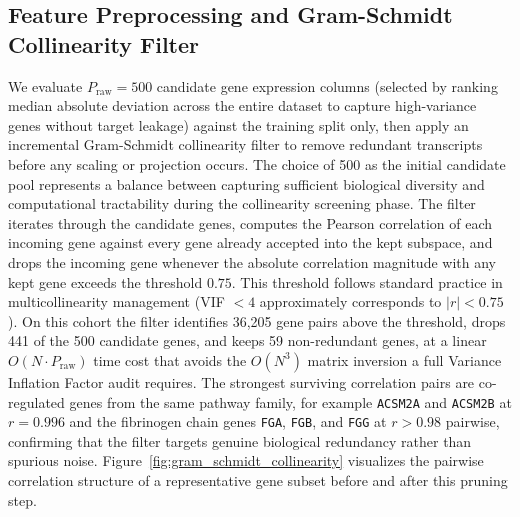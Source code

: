 \documentclass[sigconf, review=true]{acmart}
\begin{document}
\subsection{Feature Preprocessing and Gram-Schmidt Collinearity Filter}
We evaluate $P_{\text{raw}} = 500$ candidate gene expression columns (selected by ranking median absolute deviation across the entire dataset to capture high-variance genes without target leakage) against the training split only, then apply an incremental Gram-Schmidt collinearity filter to remove redundant transcripts before any scaling or projection occurs. The choice of 500 as the initial candidate pool represents a balance between capturing sufficient biological diversity and computational tractability during the collinearity screening phase. The filter iterates through the candidate genes, computes the Pearson correlation of each incoming gene against every gene already accepted into the kept subspace, and drops the incoming gene whenever the absolute correlation magnitude with any kept gene exceeds the threshold $0.75$. This threshold follows standard practice in multicollinearity management (VIF $< 4$ approximately corresponds to $|r| < 0.75$). On this cohort the filter identifies 36,205 gene pairs above the threshold, drops 441 of the 500 candidate genes, and keeps 59 non-redundant genes, at a linear $O(N \cdot P_{\text{raw}})$ time cost that avoids the $O(N^3)$ matrix inversion a full Variance Inflation Factor audit requires. The strongest surviving correlation pairs are co-regulated genes from the same pathway family, for example \texttt{ACSM2A} and \texttt{ACSM2B} at $r = 0.996$ and the fibrinogen chain genes \texttt{FGA}, \texttt{FGB}, and \texttt{FGG} at $r > 0.98$ pairwise, confirming that the filter targets genuine biological redundancy rather than spurious noise. Figure~\ref{fig:gram_schmidt_collinearity} visualizes the pairwise correlation structure of a representative gene subset before and after this pruning step.
\end{document}
